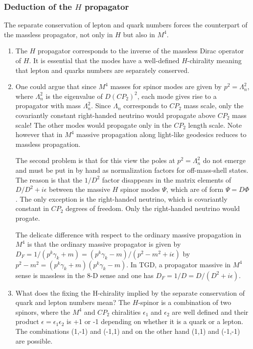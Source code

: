 \documentclass[10pt,epsf]{article}
\begin{document}
\subsubsection{Deduction of the $H$ propagator}


The separate conservation of lepton and quark numbers forces  the counterpart of the massless propagator, not only in $H$ but also in $M^4$.

\begin{enumerate}  

\item  The $H$ propagator corresponds to the inverse of the massless Dirac operator of $H$.    It  is essential that  the modes have a well-defined $H$-chirality meaning that lepton and quarks numbers  are separately conserved.

\item One could argue that   since  $M^4$ masses for spinor modes  are given by $p^2= \Lambda_n^2$, where $\Lambda_n^2$ is the eigenvalue of $D(CP_2)^2$,  each mode gives rise to a propagator with mass $\Lambda_n^2$.  Since $\Lambda_n$ corresponds to $CP_2$ mass scale, only the covariantly constant right-handed neutrino would propagate above $CP_2$ mass scale! The other modes would propagate only in the $CP_2$ length scale.  Note however   that in $M^4$  massive propagation along light-like  geodesics reduces to massless propagation.

The second problem is that for this view the poles at $p^2= \Lambda_n^2$ do not emerge and must be put in by hand as normalization factors for off-mass-shell states.  The reason is that the $1/D^2$ factor disappears in the matrix elements of $D/D^2+i\epsilon$   between the massive $H$ spinor modes $\Psi$, which are of form $\Psi=D\Phi$. The only exception is the right-handed neutrino, which is covariantly constant in $CP_2$ degrees of freedom. Only the  right-handed neutrino would progate. 

The delicate difference with respect to the ordinary massive propagation in $M^4$ is that the  ordinary  massive propagator is given by $D_F=1/(p^k\gamma_k+m)= (p^k\gamma_k-m)/(p^2-m^2+i\epsilon)$ by $p^2-m^2=(p^k\gamma_k+m)(p^k\gamma_k-m)$. In TGD,  a propagator massive in $M^4$ sense is massless in the 8-D sense and one has $D_F=1/D= D/(D^2+i\epsilon)$.

\item What does the fixing the H-chirality implied by the  separate conservation of quark and lepton numbers mean? The $H$-spinor is a combination of two  spinors, where the $M^4$ and $CP_2$ chiralities $\epsilon_1$ and $\epsilon_2$ are well defined and their product $\epsilon=\epsilon_1\epsilon_2$ is +1 or -1 depending on whether it is a quark or a lepton. The combinations (1,-1) and (-1,1) and on the other hand (1,1) and (-1,-1) are possible.


\end{enumerate}
\end{document}
